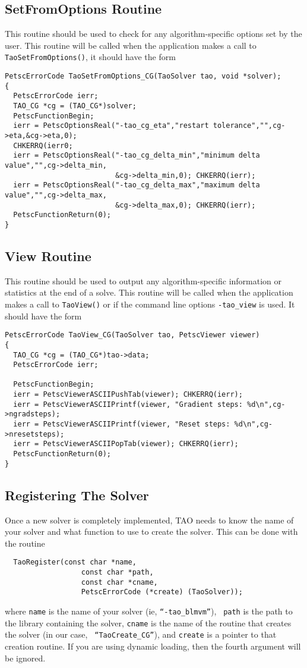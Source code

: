 \subsection{SetFromOptions Routine}
This routine should be used to check for any algorithm-specific options set 
by the user. This routine will be called when the application makes a call
to {\tt TaoSetFromOptions()}, it should have the form
\begin{verbatim}
PetscErrorCode TaoSetFromOptions_CG(TaoSolver tao, void *solver);
{
  PetscErrorCode ierr;
  TAO_CG *cg = (TAO_CG*)solver;
  PetscFunctionBegin;
  ierr = PetscOptionsReal("-tao_cg_eta","restart tolerance","",cg->eta,&cg->eta,0);
  CHKERRQ(ierr0;
  ierr = PetscOptionsReal("-tao_cg_delta_min","minimum delta value","",cg->delta_min,
                          &cg->delta_min,0); CHKERRQ(ierr);
  ierr = PetscOptionsReal("-tao_cg_delta_max","maximum delta value","",cg->delta_max,
                          &cg->delta_max,0); CHKERRQ(ierr);
  PetscFunctionReturn(0);
}
\end{verbatim}

\subsection{View Routine}
This routine should be used to output any algorithm-specific information
or statistics at the end of a solve.
This routine will be called when the application makes a call to 
{\tt TaoView()} or if the command line options {\tt -tao\_view} is used.
It should have the form
\begin{verbatim}
PetscErrorCode TaoView_CG(TaoSolver tao, PetscViewer viewer)
{ 
  TAO_CG *cg = (TAO_CG*)tao->data;
  PetscErrorCode ierr;

  PetscFunctionBegin;
  ierr = PetscViewerASCIIPushTab(viewer); CHKERRQ(ierr);
  ierr = PetscViewerASCIIPrintf(viewer, "Gradient steps: %d\n",cg->ngradsteps);
  ierr = PetscViewerASCIIPrintf(viewer, "Reset steps: %d\n",cg->nresetsteps);
  ierr = PetscViewerASCIIPopTab(viewer); CHKERRQ(ierr);
  PetscFunctionReturn(0);
}
\end{verbatim}


\subsection{Registering The Solver}
Once a new solver is completely implemented, TAO needs to know the name of
your solver and what function to use to create the solver.  This can be done
with the routine
\begin{verbatim}
  TaoRegister(const char *name, 
                  const char *path,
                  const char *cname, 
                  PetscErrorCode (*create) (TaoSolver));
\end{verbatim}
\noindent
where {\tt name} is the name of your solver (ie, {\tt ``-tao\_blmvm''}), {\tt
path} is the path to the library containing the solver, {\tt cname} is the
name of the routine that creates the solver (in our case, {\tt
  ``TaoCreate\_CG''}), and {\tt create} is a pointer to that creation
routine.  If you are using dynamic loading, then the fourth argument will be
ignored.

